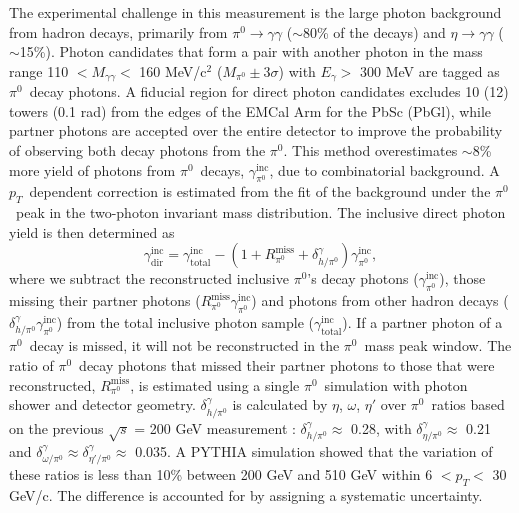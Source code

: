 \documentclass[twocolumn,letterpaper,aps,prl,longbibliography,superscriptaddress,floatfix]{revtex4-2}
\newcommand{\pT}{\ensuremath{p_T}}
\newcommand{\pizero}{\ensuremath{\pi^0}}
\begin{document}
The experimental challenge in this measurement is the large photon background from hadron decays, primarily from $\pi^0 \rightarrow \gamma\gamma$ ($\sim$80\% of the decays) and $\eta \rightarrow \gamma\gamma$ ($\sim$15\%). Photon candidates that form a pair with another photon in the mass range 110 $< M_{\gamma\gamma} <$ 160 MeV/c$^2$ ($M_{\pi^0} \pm 3\sigma$) with $E_{\gamma} >$ 300 MeV are tagged as \pizero\ decay photons. A fiducial region for direct photon candidates excludes 10 (12) towers (0.1 rad) from the edges of the EMCal Arm for the PbSc (PbGl), while partner photons are accepted over the entire detector to improve the probability of observing both decay photons from the \pizero. This method overestimates $\sim$8\% more yield of photons from \pizero\ decays, $\gamma_{\pi^0}^{\text{inc}}$, due to combinatorial background. A \pT\ dependent correction is estimated from the fit of the background under the \pizero\ peak in the two-photon invariant mass distribution. The inclusive direct photon yield is then determined as
\begin{equation} \label{eq:inc}
\gamma_{\text{dir}}^{\text{inc}} = \gamma_{\text{total}}^{\text{inc}} - \left( 1 + R_{\pi^0}^{\text{miss}} + \delta_{h/\pi^0}^{\gamma} \right) \gamma_{\pi^0}^{\text{inc}},
\end{equation}
where we subtract the reconstructed inclusive \pizero's decay photons ($\gamma_{\pi^0}^{\text{inc}}$), those missing their partner photons ($R_{\pi^0}^{\text{miss}}\gamma_{\pi^0}^{\text{inc}}$) and photons from other hadron decays ($\delta_{h/\pi^0}^{\gamma}\gamma_{\pi^0}^{\text{inc}}$) from the total inclusive photon sample ($\gamma_{\text{total}}^{\text{inc}}$). If a partner photon of a \pizero\ decay is missed, it will not be reconstructed in the \pizero\ mass peak window. The ratio of \pizero\ decay photons that missed their partner photons to those that were reconstructed, $R_{\pi^0}^{\text{miss}}$, is estimated using a single \pizero\ simulation with photon shower and detector geometry. $\delta_{h/\pi^0}^{\gamma}$ is calculated by $\eta$, $\omega$, $\eta'$ over \pizero\ ratios based on the previous $\sqrt{s}$ = 200 GeV measurement \cite{PhysRevD.83.052004}: $\delta_{h/\pi^0}^{\gamma} \approx$ 0.28, with $\delta_{\eta/\pi^0}^{\gamma} \approx$ 0.21 and $\delta_{\omega/\pi^0}^{\gamma} \approx \delta_{\eta'/\pi^0}^{\gamma}  \approx$ 0.035. A PYTHIA \cite{Sjostrand:2006za} simulation showed that the variation of these ratios is less than 10\% between 200 GeV and 510 GeV within 6 $< p_T <$ 30 GeV/c. The difference is accounted for by assigning a systematic uncertainty.
\end{document}
